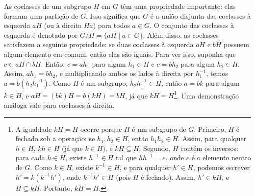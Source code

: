 As coclasses de um subgrupo $H$ em $G$ têm uma propriedade importante:
elas formam uma partição de $G$. Isso significa que $G$ é a união
disjunta das coclasses à esquerda $aH$ (ou à direita $Ha$) para todos
$a \in G$. O conjunto das coclasses à esquerda é denotado por
$G/H = \{ aH \mid a \in G \}$. Além disso, as coclasses satisfazem a seguinte
propriedade: se duas coclasses à esquerda $aH$ e $bH$ possuem algum
elemento em comum, então elas são iguais. Para ver isso, suponha que
$c \in aH \cap bH$. Então, $c = ah_1$ para algum $h_1 \in H$ e $c = bh_2$
para algum $h_2 \in H$. Assim, $ah_1 = bh_2$, e multiplicando ambos
os lados à direita por $h_1^{-1}$, temos $a = b(h_2 h_1^{-1})$. Como
$H$ é um subgrupo, $h_2 h_1^{-1} \in H$, então $a = bk$ para algum
$k \in H$, e $aH = (bk)H = b(kH) = bH$, já que $kH = H$\footnote{
  A igualdade $kH = H$ ocorre porque $H$ é um subgrupo de $G$.
  Primeiro, $H$ é fechado sob a operação: se $h_1, h_2 \in H$,
  então $h_1 h_2 \in H$. Assim, para qualquer $h \in H$, $kh \in H$
  (já que $k \in H$), e $kH \subseteq H$. Segundo, $H$ contém
  os inversos: para cada $h \in H$, existe $h^{-1} \in H$ tal que
  $h h^{-1} = e$, onde $e$ é o elemento neutro de $G$. Como $k \in H$,
  existe $k^{-1} \in H$, e para qualquer $h' \in H$, podemos escrever
  $h' = k (k^{-1} h')$, onde $k^{-1} h' \in H$ (pois $H$ é fechado).
  Assim, $h' \in kH$, e $H \subseteq kH$. Portanto, $kH = H$.}.
Uma demonstração análoga vale para coclasses à direita.

